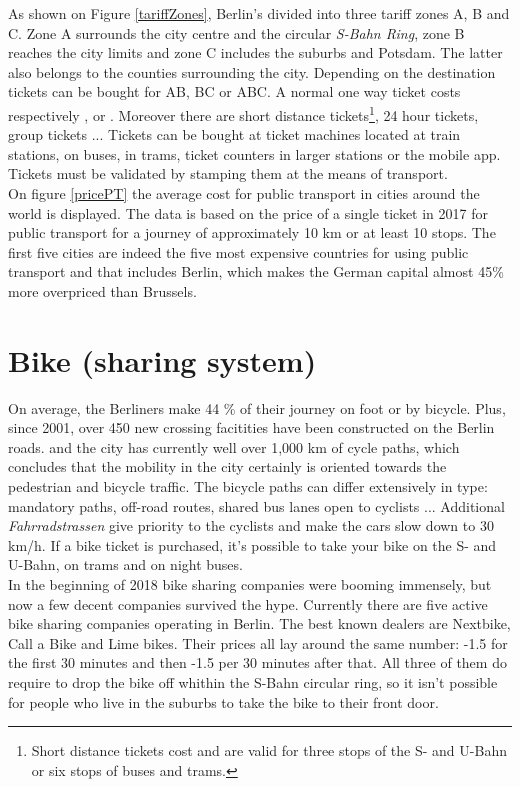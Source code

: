 As shown on Figure \ref{tariffZones}, Berlin's divided into three tariff zones A, B and C. Zone A surrounds the city centre and the circular \textit{S-Bahn Ring}, zone B reaches the city limits and zone C includes the suburbs and Potsdam. The latter also belongs to the counties surrounding the city. Depending on the destination tickets can be bought for AB, BC or ABC\cite{tarif}. A normal one way ticket costs respectively ,  or . Moreover there are short distance tickets\footnote{Short distance tickets cost  and are valid for three stops of the S- and U-Bahn or six stops of buses and trams.}, 24 hour tickets, group tickets ...  Tickets can be bought at ticket machines located at train stations, on buses, in trams, ticket counters in larger stations or the mobile app. Tickets must be validated by stamping them at the means of transport\cite{ticketing1}. \\ \newline
On figure \ref{pricePT} the average cost for public transport in cities around the world is displayed. The data is based on the price of a single ticket in 2017 for public transport for a journey of approximately 10 km or at least 10 stops. The first five cities are indeed the five most expensive countries for using public transport and that includes Berlin, which makes the German capital almost 45\% more overpriced than Brussels.


\section{Bike (sharing system)}

On average, the Berliners make 44 \% of their journey on foot or by bicycle. Plus, since 2001, over 450 new crossing facitities have been constructed on the Berlin roads. and the city has currently well over 1,000 km of cycle paths, which concludes that the mobility in the city certainly is oriented towards the pedestrian and bicycle traffic. The bicycle paths can differ extensively in type: mandatory paths, off-road routes, shared bus lanes open to cyclists ... Additional \textit{Fahrradstrassen} give priority to the cyclists and make the cars slow down to 30 km/h. If a bike ticket is purchased, it's possible to take your bike on the S- and U-Bahn, on trams and on night buses\cite{MobilityCity}\cite{cycling}. \\ \newline
In the beginning of 2018 bike sharing companies were booming immensely, but now a few decent companies survived the hype. Currently there are five active bike sharing companies operating in Berlin. The best known dealers are Nextbike, Call a Bike and Lime bikes. Their prices all lay around the same number: -1.5 for the first 30 minutes and then -1.5 per 30 minutes after that. All three of them do require to drop the bike off whithin the S-Bahn circular ring, so it isn't possible for people who live in the suburbs to take the bike to their front door\cite{bikeshare}.



